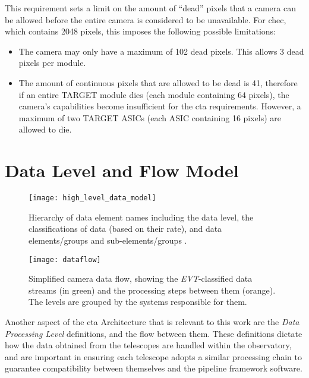 This requirement sets a limit on the amount of ``dead'' pixels that a camera can be allowed before the entire camera is considered to be unavailable. For \gls{chec}, which contains 2048 pixels, this imposes the following possible limitations:
\begin{itemize}
\item The camera may only have a maximum of 102 dead pixels. This allows 3 dead pixels per module.
\item The amount of continuous pixels that are allowed to be dead is 41, therefore if an entire TARGET module dies (each module containing 64 pixels), the camera's capabilities become insufficient for the \gls{cta} requirements. However, a maximum of two TARGET ASICs (each ASIC containing 16 pixels) are allowed to die.
\end{itemize}

\section{Data Level and Flow Model} \label{section:data_levels}

\begin{figure}[H]
 	\centering
  	\texttt{[image: high\_level\_data\_model]} 
	\caption[High-level data model hierarchy.]{Hierarchy of data element names including the data level, the classifications of data (based on their rate), and data elements/groups and sub-elements/groups \cite{Kosack2017}.}
	\label{fig:high_level_data_model}
\end{figure}

\begin{wrapfigure}[37]{r}{0.32\textwidth}
	\texttt{[image: dataflow]}
	\caption[Simplified camera data flow.]{Simplified camera data flow, showing the \textit{EVT}-classified data streams (in green) and the processing steps between them (orange). The levels are grouped by the systems responsible for them.}
	\label{fig:dataflow}
\end{wrapfigure}

Another aspect of the \gls{cta} Architecture that is relevant to this work are the \textit{Data Processing Level} definitions, and the flow between them. These definitions dictate how the data obtained from the telescopes are handled within the observatory, and are important in ensuring each telescope adopts a similar processing chain to guarantee compatibility between themselves and the pipeline framework software.

